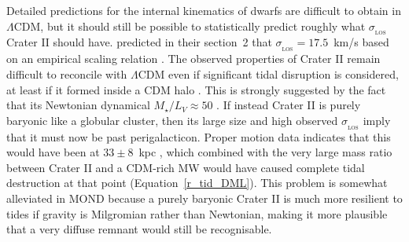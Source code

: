\documentclass[fleqn,usenatbib,useAMS]{mnras} %
\begin{document}
Detailed predictions for the internal kinematics of dwarfs are difficult to obtain in $\Lambda$CDM, but it should still be possible to statistically predict roughly what $\sigma_{_\text{LOS}}$ Crater II should have. \citet{McGaugh_2016_CraterII} predicted in their section~2 that $\sigma_{_\text{LOS}} = 17.5$~km/s based on an empirical scaling relation \citep{Walker_2010}. The observed properties of Crater II remain difficult to reconcile with $\Lambda$CDM even if significant tidal disruption is considered, at least if it formed inside a CDM halo \citep{Borukhovetskaya_2022, Errani_2022}. This is strongly suggested by the fact that its Newtonian dynamical $M_{\star}/L_V \approx 50$ \citep{Caldwell_2017, Fu_2019}. If instead Crater II is purely baryonic like a globular cluster, then its large size and high observed $\sigma_{_\text{LOS}}$ imply that it must now be past perigalacticon. Proper motion data indicates that this would have been at $33 \pm 8$~kpc \citep[table~4 of][]{Hefan_Li_2021}, which combined with the very large mass ratio between Crater II and a CDM-rich MW would have caused complete tidal destruction at that point (Equation~\ref{r_tid_DML}). This problem is somewhat alleviated in MOND because a purely baryonic Crater II is much more resilient to tides if gravity is Milgromian rather than Newtonian, making it more plausible that a very diffuse remnant would still be recognisable.


\end{document}
